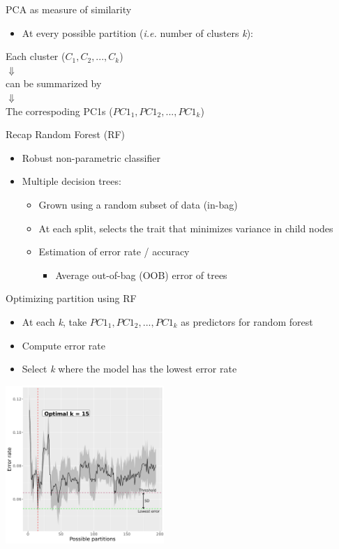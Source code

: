 \documentclass[presentation]{beamer}
\begin{document}
\begin{frame}[label={sec:org6739f58}]{PCA as measure of similarity}
\begin{itemize}
\item At every possible partition (\emph{i.e.} number of clusters \emph{k}):
\end{itemize}
\begin{center}
Each cluster (\(C_1, C_2, ..., C_k\))\\
\(\Downarrow\)\\
can be summarized by\\
\(\Downarrow\)\\
The correspoding PC1s (\(PC1_1, PC1_2, ..., PC1_k\))
\end{center}
\end{frame}

\begin{frame}[label={sec:orgbf3fccf}]{Recap Random Forest (RF)}
\begin{itemize}
\item Robust non-parametric classifier
\item Multiple decision trees:
\begin{itemize}
\item Grown using a random subset of data (in-bag)
\item At each split, selects the trait that minimizes variance in child nodes
\item Estimation of error rate / accuracy
\begin{itemize}
\item Average out-of-bag (OOB) error of trees
\end{itemize}
\end{itemize}
\end{itemize}
\end{frame}

\begin{frame}[label={sec:org99c06ca}]{Optimizing partition using RF}
\begin{itemize}
\item At each \emph{k}, take \(PC1_1, PC1_2, ..., PC1_k\) as predictors for random forest
\item Compute error rate
\item Select \emph{k} where the model has the lowest error rate
\end{itemize}
\begin{center}
\includegraphics[width=6cm]{./plots/kopt_phen.png}
\end{center}
\end{frame}
\end{document}
